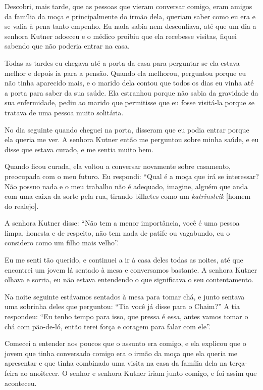 Descobri, mais tarde, que as pessoas que vieram conversar comigo, eram
amigos da família da moça e principalmente do irmão dela, queriam saber
como eu era e se valia à pena tanto empenho. Eu nada sabia nem
desconfiava, até que um dia a senhora Kutner adoeceu e o médico proibiu
que ela recebesse visitas, fiquei sabendo que não poderia entrar na
casa.

Todas as tardes eu chegava até a porta da casa para perguntar se ela
estava melhor e depois ia para a pensão. Quando ela melhorou, perguntou
porque eu não tinha aparecido mais, e o marido dela contou que todos os
dias eu vinha até a porta para saber da sua saúde. Ela estranhou porque
não sabia da gravidade da sua enfermidade, pediu ao marido que
permitisse que eu fosse visitá-la porque se tratava de uma pessoa muito
solitária.

No dia seguinte quando cheguei na porta, disseram que eu podia entrar
porque ela queria me ver. A senhora Kutner então me perguntou sobre
minha saúde, e eu disse que estava curado, e me sentia muito bem.

Quando ficou curada, ela voltou a conversar novamente sobre casamento,
preocupada com o meu futuro. Eu respondi: ``Qual é a moça que irá se
interessar? Não possuo nada e o meu trabalho não é adequado, imagine,
alguém que anda com uma caixa da sorte pela rua, tirando bilhetes como
um \textit{katrinstcik} [homem do realejo].

A senhora Kutner disse: ``Não tem a menor importância, você é uma pessoa
limpa, honesta e de respeito, não tem nada de patife ou vagabundo, eu o
considero como um filho mais velho''.

Eu me senti tão querido, e continuei a ir à casa deles todas as noites,
até que encontrei um jovem lá sentado à mesa e conversamos bastante. A
senhora Kutner olhava e sorria, eu não estava entendendo o que
significava o seu contentamento.

Na noite seguinte estávamos sentados à mesa para tomar chá, e junto
sentava uma sobrinha deles que perguntou: ``Tia você já disse para o
Chaim?'' A tia respondeu: ``Eu tenho tempo para isso, que pressa é essa,
antes vamos tomar o chá com pão-de-ló, então terei força e coragem para
falar com ele''.

Comecei a entender aos poucos que o assunto era comigo, e ela explicou
que o jovem que tinha conversado comigo era o irmão da moça que ela
queria me apresentar e que tinha combinado uma visita na casa da família
dela na terça-feira ao anoitecer. O senhor e senhora Kutner iriam junto
comigo, e foi assim que aconteceu.

